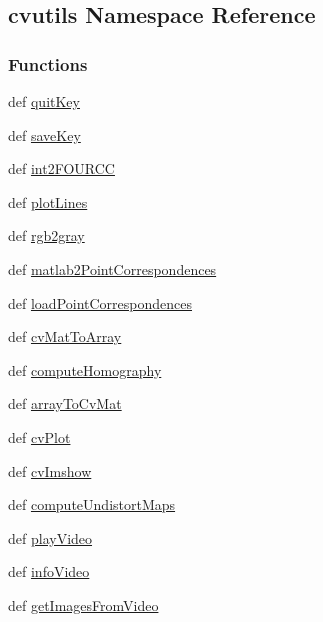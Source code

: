 \hypertarget{namespacecvutils}{\subsection{cvutils Namespace Reference}
\label{namespacecvutils}
}
\subsubsection*{Functions}
\begin{DoxyCompactItemize}
\item 
def \hyperlink{namespacecvutils_a967d62f6c31704fda34fcf019fcce5cd}{quit\-Key}
\item 
def \hyperlink{namespacecvutils_a343297addb2aed7d21409d6b21862400}{save\-Key}
\item 
def \hyperlink{namespacecvutils_ab5ff2f1feff45bad22f0a7e2d6f04180}{int2\-F\-O\-U\-R\-C\-C}
\item 
def \hyperlink{namespacecvutils_a878c6b1429780d9834fc90b50a3f3fd0}{plot\-Lines}
\item 
def \hyperlink{namespacecvutils_ad5fb874c6b6c447ebdff12a2e5f10cc1}{rgb2gray}
\item 
def \hyperlink{namespacecvutils_a1ef92b1e6e5869ed831ae19aa8ee474c}{matlab2\-Point\-Correspondences}
\item 
def \hyperlink{namespacecvutils_ab8607f0ab54f1c31b78249022e961938}{load\-Point\-Correspondences}
\item 
def \hyperlink{namespacecvutils_a05850f13e7fe0c395026cae40e8e6da5}{cv\-Mat\-To\-Array}
\item 
def \hyperlink{namespacecvutils_a9b0320fe7735d32e5c5a17b4f99f4c6d}{compute\-Homography}
\item 
def \hyperlink{namespacecvutils_acaf76b54dd43d5d08b52f0150e991391}{array\-To\-Cv\-Mat}
\item 
def \hyperlink{namespacecvutils_a4623f949cd11e759134652a00f60e1e0}{cv\-Plot}
\item 
def \hyperlink{namespacecvutils_a8d3c80df66c0c1651a61b8b9abd25223}{cv\-Imshow}
\item 
def \hyperlink{namespacecvutils_a8a0e79b0b5c34ccf51cc8cdcab0def47}{compute\-Undistort\-Maps}
\item 
def \hyperlink{namespacecvutils_a7dd360d049098ae9b163da5a353c8bfb}{play\-Video}
\item 
def \hyperlink{namespacecvutils_a017c9a35775f6f6e5c1673948e46cd65}{info\-Video}
\item 
def \hyperlink{namespacecvutils_ad6d784fc8a56a342116e18ef5320e95b}{get\-Images\-From\-Video}

\end{DoxyCompactItemize}
